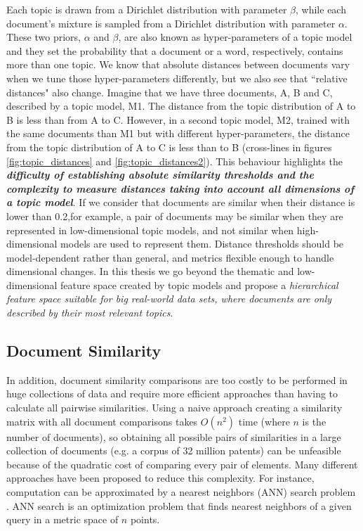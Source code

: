 Each topic is drawn from a Dirichlet distribution with parameter $\beta$, while each document's mixture is sampled from a Dirichlet distribution with parameter $\alpha$. These two priors, $\alpha$ and $\beta$, are also known as hyper-parameters of a topic model and they set the probability that a document or a word, respectively, contains more than one topic. We know that absolute distances between documents vary when we tune those hyper-parameters differently, but we also see that ``relative distances" also change. Imagine that we have three documents, A, B and C, described by a topic model, M1. The distance from the topic distribution of A to B is less than from A to C. However, in a second topic model, M2, trained with the same documents than M1 but with different hyper-parameters, the distance from the topic distribution of A to C is less than to B (cross-lines in figures \ref{fig:topic_distances} and \ref{fig:topic_distances2}). This behaviour highlights the \textbf{\textit{difficulty of establishing absolute similarity thresholds and the complexity to measure distances taking into account all dimensions of a topic model}}. If we consider that documents are similar when their distance is lower than 0.2,for example, a pair of documents may be similar when they are represented in low-dimensional topic models, and not similar when high-dimensional models are used to represent them. Distance thresholds should be model-dependent rather than general, and metrics flexible enough to handle dimensional changes. In this thesis we go beyond the thematic and low-dimensional feature space created by topic models and propose a \textit{hierarchical feature space suitable for big real-world data sets, where documents are only described by their most relevant topics}.


\subsection{Document Similarity}
\label{sec:document-similarity}

In addition, document similarity comparisons are too costly to be performed in huge collections of data and require more efficient approaches than having to calculate all pairwise similarities. Using a naive approach creating a similarity matrix with all document comparisons takes $O(n^2)$ time (where $n$ is the number of documents), so obtaining all possible pairs of similarities in a large collection of documents (e.g. a corpus of 32 million patents) can be unfeasible because of the quadratic cost of comparing every pair of elements. Many different approaches have been proposed to reduce this complexity. For instance, computation can be approximated by a nearest neighbors (ANN) search problem \citep{Indyk1998}. ANN search is an optimization problem that finds nearest neighbors of a given query in a metric space of $n$ points. 

